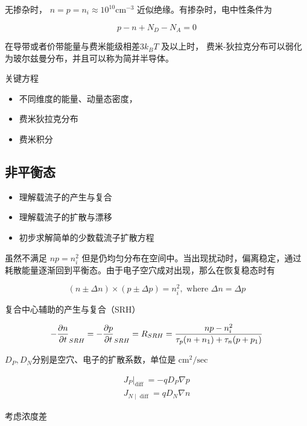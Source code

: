 \documentclass[cn,11pt,chinese,black,simple]{../elegantbook}
\begin{document}
无掺杂时， \(n = p = n_i \approx 10^{10} \text{cm}^{-3}\) 近似绝缘。有掺杂时，电中性条件为 

\begin{equation}\label{eq:00:02}
    p - n + N_D - N_A = 0
\end{equation}


在导带或者价带能量与费米能级相差\(3 k_B T\) 及以上时， 费米-狄拉克分布可以弱化为玻尔兹曼分布，并且可以称为简并半导体。

关键方程

\begin{itemize}
    \item 不同维度的能量、动量态密度，
    \item 费米狄拉克分布
    \item 费米积分
\end{itemize}

\subsection{非平衡态}

\begin{itemize}
    \item 理解载流子的产生与复合
    \item 理解载流子的扩散与漂移
    \item 初步求解简单的少数载流子扩散方程
\end{itemize}

虽然不满足 \(n p = n_i^2\) 但是仍均匀分布在空间中。当出现扰动时，偏离稳定，通过耗散能量逐渐回到平衡态。由于电子空穴成对出现，那么在恢复稳态时有

\[
(n \pm \Delta n) \times (p \pm \Delta p) = n_i^2, \text{ where } \Delta n = \Delta p
\]

复合中心辅助的产生与复合（SRH）

\begin{equation}
    - \frac{\partial{}n}{\partial{}t}_{SRH} = - \frac{\partial{}p}{\partial{}t}_{SRH} = R_{SRH} = \frac{np - n_i^2}{\tau_p(n + n_1) + \tau_n(p + p_1)}
\end{equation}


\(D_P, D_N\)分别是空穴、电子的扩散系数，单位是 \(\text{cm}^2/\text{sec}\)

\[\begin{array}{l}
    \left. J _{ P }\right|_{\text {diff }}=-q D_{ P } \nabla p \\
    J _{ N \mid \text { diff }}=q D_{ N } \nabla n
\end{array}\]


考虑浓度差
\end{document}

